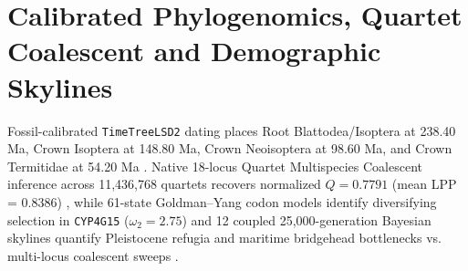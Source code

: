 \documentclass[10pt,letterpaper]{article}
\begin{document}
\section{Calibrated Phylogenomics, Quartet Coalescent and Demographic Skylines}
Fossil-calibrated \texttt{TimeTreeLSD2} dating places Root Blattodea/Isoptera at 238.40 Ma, Crown Isoptera at 148.80 Ma, Crown Neoisoptera at 98.60 Ma, and Crown Termitidae at 54.20 Ma \cite{ref2,ref3,ref14}. Native 18-locus Quartet Multispecies Coalescent inference across 11,436,768 quartets recovers normalized $Q = 0.7791$ (mean LPP = 0.8386) \cite{ref15}, while 61-state Goldman--Yang codon models identify diversifying selection in \texttt{CYP4G15} ($\omega_2 = 2.75$) \cite{ref6,ref17} and 12 coupled 25,000-generation Bayesian skylines quantify Pleistocene refugia and maritime bridgehead bottlenecks vs. multi-locus coalescent sweeps \cite{ref11,ref16}.
\end{document}
